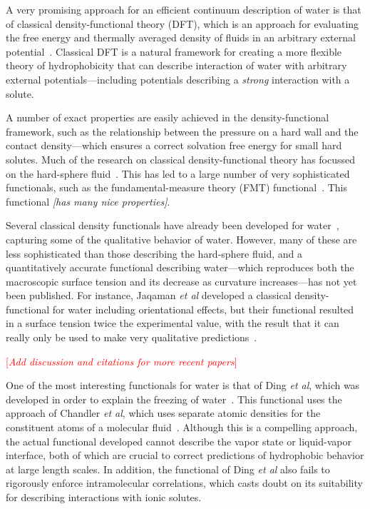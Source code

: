 \documentclass[letterpaper,twocolumn,amsmath,amssymb,prb]{revtex4-1}
\newcommand{\needsworklater}[1]{\emph{[#1]}}
\newcommand{\needsworknow}[1]{\textcolor{red}{[\emph{#1}]}}
\begin{document}
A very promising approach for an efficient continuum description of water
is that of classical density-functional theory (DFT), which is an approach
for evaluating the free energy and thermally averaged density of fluids in
an arbitrary external potential~\cite{ebner1976}.  Classical DFT is a
natural framework for creating a more flexible theory of hydrophobicity
that can describe interaction of water with arbitrary external
potentials---including potentials describing a \emph{strong} interaction
with a solute.

A number of exact properties are easily achieved in the density-functional
framework, such as the relationship between the pressure on a hard wall and
the contact density---which ensures a correct solvation free energy for
small hard solutes.  Much of the research on classical density-functional
theory has focussed on the hard-sphere fluid~\cite{curtin1985,
rosenfeld1989, rosenfeld1993, rosenfeld1997, tarazona1997, tarazona2000}.
This has led to a large number of very sophisticated functionals, such as
the fundamental-measure theory (FMT) functional~\cite{rosenfeld1989,
rosenfeld1993, rosenfeld1997, tarazona1997, tarazona2000}.  This functional
\needsworklater{has many nice properties}.

Several classical density functionals have already been developed for
water~\cite{ding1987, Yang1992, Jaqaman2004}, capturing some of the
qualitative behavior of water.  However, many of these are less
sophisticated than those describing the hard-sphere fluid, and a
quantitatively accurate functional describing water---which reproduces both
the macroscopic surface tension and its decrease as curvature
increases---has not yet been published.  For instance, Jaqaman \emph{et al}
developed a classical density-functional for water including orientational
effects, but their functional resulted in a surface tension twice the
experimental value, with the result that it can really only be used to make
very qualitative predictions~\cite{Jaqaman2004}.

\needsworknow{Add discussion and citations for more recent papers}

One of the most interesting functionals for water is that of Ding \emph{et
al}, which was developed in order to explain the freezing of
water~\cite{ding1987}.  This functional uses the approach of Chandler
\emph{et al}, which uses separate atomic densities for the constituent
atoms of a molecular fluid~\cite{chandler1986a, chandler1986b}.  Although
this is a compelling approach, the actual functional developed cannot
describe the vapor state or liquid-vapor interface, both of which are
crucial to correct predictions of hydrophobic behavior at large length
scales.  In addition, the functional of Ding \emph{et al} also fails to
rigorously enforce intramolecular correlations, which casts doubt on its
suitability for describing interactions with ionic solutes.
\end{document}
